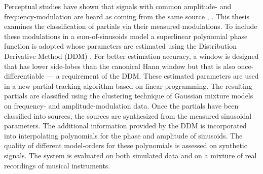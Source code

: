 Perceptual studies have shown that signals with common amplitude\hyp{} and
frequency\hyp{}modulation are heard as coming from the same source
\cite{mcadams1989segregation}, \cite{marin1991segregation}. This thesis examines
the classification of partials via their measured modulations. To include these
modulations in a sum-of-sinusoids model a superlinear polynomial phase function
is adopted whose parameters are estimated using the Distribution Derivative
Method (DDM) \cite{betser2009sinusoidal}. For better estimation accuracy, a
window is designed that has lower side-lobes than the canonical Hann window but
that is also once-differentiable --- a requirement of the DDM. These estimated
parameters are used in a new partial tracking algorithm based on linear
programming. The resulting partials are classified using the clustering
technique of Gaussian mixture models \cite{friedman2001elements} on frequency-
and amplitude-modulation data. Once the partials have been classified into
sources, the sources are synthesized from the measured sinusoidal parameters.
The additional information provided by the DDM is incorporated into
interpolating polynomials for the phase and amplitude of sinusoids. The quality
of different model-orders for these polynomials is assessed on synthetic
signals. The system is evaluated on both simulated data and on a mixture of real
recordings of musical instruments.
